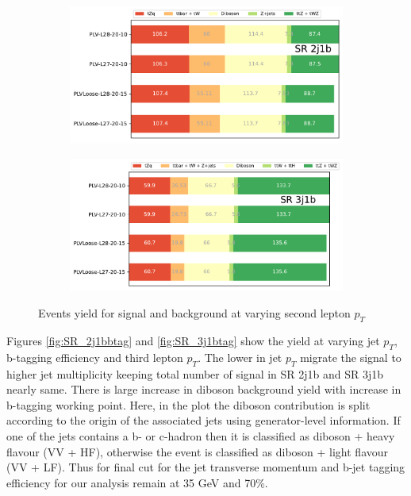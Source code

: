   \begin{figure}[h!] 
  \begin{subfigure}[b]{0.49\linewidth}
    \centering
    \includegraphics[width=\linewidth]{ubonn-thesis/Chapters/Chapters_05/Figure/Cuts Optimization/SR2j1b_PLVLoose_27.pdf} 
  \end{subfigure} 
  \hfill
  \begin{subfigure}[b]{0.49\linewidth}
    \centering
    \includegraphics[width=\linewidth]{ubonn-thesis/Chapters/Chapters_05/Figure/Cuts Optimization/SR3j1b_PLVLoose_27.pdf} 
  \end{subfigure} 
  \caption{Events yield for signal and background at varying second lepton $p_{T}$}
  \label{fig:first_second_lepton_pt}
  \end{figure}
 
Figures \ref{fig:SR_2j1bbtag} and \ref{fig:SR_3j1btag} show the yield at varying jet $p_{T}$, b-tagging efficiency and third lepton $p_{T}$. The lower in jet $p_{T}$ migrate the signal to higher jet multiplicity keeping total number of signal in SR 2j1b and SR 3j1b nearly same. There is large increase in diboson background yield with increase in b-tagging working point. Here, in the plot the diboson contribution is split according to the origin of the associated jets using generator-level information. If one of the jets contains a b- or c-hadron then it is classified as diboson + heavy flavour (VV + HF), otherwise the event is classified as diboson + light flavour (VV + LF). Thus for final cut for the jet transverse momentum and b-jet tagging efficiency for our analysis remain at 35 GeV and 70\%. 


